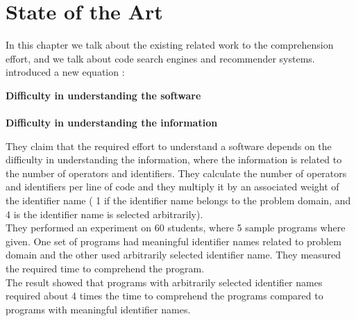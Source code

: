 \documentclass[12pt,mscthesis]{usiinfthesis}
\begin{document}
\chapter{State of the Art}
	In this chapter we talk about the existing related work to the comprehension effort, and we talk about code search engines and recommender systems.\\ 

	\citet{Kushwaha:2006:ICI:1163514.1163533} introduced a new equation :\\
	\begin{center}
	 \textbf{Difficulty in understanding the software}\\
	 \approx\\
	  \textbf{Difficulty in understanding the information}
	  \end{center}

	They claim that the required effort to understand a software depends on the difficulty in understanding the information, where the information is related to the number of operators and identifiers. They calculate the number of operators and identifiers per line of code and they multiply it by an associated weight of the identifier name ( 1 if the identifier name belongs to the problem domain, and 4 is the identifier name is selected arbitrarily). \\
	They performed an experiment on 60 students, where 5 sample programs where given. One set of programs had meaningful identifier names related to problem domain and the other used arbitrarily selected identifier name. They measured the required time to comprehend the program.\\ 
	The result showed that programs with arbitrarily selected identifier names required about 4 times the time to comprehend the programs compared to programs with meaningful identifier names.\\
\end{document}
